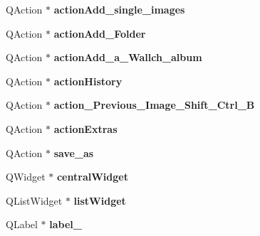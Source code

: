 \begin{DoxyCompactItemize}
\item 
\hypertarget{classUi__MainWindow_a48c15a8b0d5bd0ba1289d785e76a744b}{
QAction $\ast$ {\bfseries actionAdd\_\-single\_\-images}}
\label{classUi__MainWindow_a48c15a8b0d5bd0ba1289d785e76a744b}

\item 
\hypertarget{classUi__MainWindow_a3cae951a389067a889312a8db264268e}{
QAction $\ast$ {\bfseries actionAdd\_\-Folder}}
\label{classUi__MainWindow_a3cae951a389067a889312a8db264268e}

\item 
\hypertarget{classUi__MainWindow_adbdbc9d312e983ed7ffa1a99793eeec7}{
QAction $\ast$ {\bfseries actionAdd\_\-a\_\-Wallch\_\-album}}
\label{classUi__MainWindow_adbdbc9d312e983ed7ffa1a99793eeec7}

\item 
\hypertarget{classUi__MainWindow_a888a3a2a55d1179693017dc98e281b76}{
QAction $\ast$ {\bfseries actionHistory}}
\label{classUi__MainWindow_a888a3a2a55d1179693017dc98e281b76}

\item 
\hypertarget{classUi__MainWindow_a109a2b59e51d886849f706bf6ff4a13d}{
QAction $\ast$ {\bfseries action\_\-Previous\_\-Image\_\-Shift\_\-Ctrl\_\-B}}
\label{classUi__MainWindow_a109a2b59e51d886849f706bf6ff4a13d}

\item 
\hypertarget{classUi__MainWindow_ace7456abb046b1c717cb786b1643e60e}{
QAction $\ast$ {\bfseries actionExtras}}
\label{classUi__MainWindow_ace7456abb046b1c717cb786b1643e60e}

\item 
\hypertarget{classUi__MainWindow_aecff87ababbfe64a3e91c5129cba2274}{
QAction $\ast$ {\bfseries save\_\-as}}
\label{classUi__MainWindow_aecff87ababbfe64a3e91c5129cba2274}

\item 
\hypertarget{classUi__MainWindow_a30075506c2116c3ed4ff25e07ae75f81}{
QWidget $\ast$ {\bfseries centralWidget}}
\label{classUi__MainWindow_a30075506c2116c3ed4ff25e07ae75f81}

\item 
\hypertarget{classUi__MainWindow_ae647a15635ba8a0e5d5aec475db99d8f}{
QListWidget $\ast$ {\bfseries listWidget}}
\label{classUi__MainWindow_ae647a15635ba8a0e5d5aec475db99d8f}

\item 
\hypertarget{classUi__MainWindow_ad6bab8fb8903b8f41afea1218ee52695}{
QLabel $\ast$ {\bfseries label\_}}
\label{classUi__MainWindow_ad6bab8fb8903b8f41afea1218ee52695}


\end{DoxyCompactItemize}
